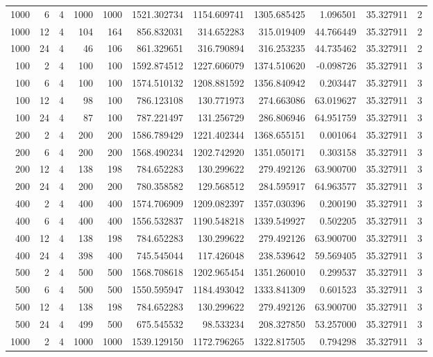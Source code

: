 \begin{table}
\begin{tabular}{rrrrrrrrrrr}
1000 & 6 & 4 & 1000 & 1000 & 1521.302734 & 1154.609741 & 1305.685425 & 1.096501 & 35.327911 & 2 \\
1000 & 12 & 4 & 104 & 164 & 856.832031 & 314.652283 & 315.019409 & 44.766449 & 35.327911 & 2 \\
1000 & 24 & 4 & 46 & 106 & 861.329651 & 316.790894 & 316.253235 & 44.735462 & 35.327911 & 2 \\
100 & 2 & 4 & 100 & 100 & 1592.874512 & 1227.606079 & 1374.510620 & -0.098726 & 35.327911 & 3 \\
100 & 6 & 4 & 100 & 100 & 1574.510132 & 1208.881592 & 1356.840942 & 0.203447 & 35.327911 & 3 \\
100 & 12 & 4 & 98 & 100 & 786.123108 & 130.771973 & 274.663086 & 63.019627 & 35.327911 & 3 \\
100 & 24 & 4 & 87 & 100 & 787.221497 & 131.256729 & 286.806946 & 64.951759 & 35.327911 & 3 \\
200 & 2 & 4 & 200 & 200 & 1586.789429 & 1221.402344 & 1368.655151 & 0.001064 & 35.327911 & 3 \\
200 & 6 & 4 & 200 & 200 & 1568.490234 & 1202.742920 & 1351.050171 & 0.303158 & 35.327911 & 3 \\
200 & 12 & 4 & 138 & 198 & 784.652283 & 130.299622 & 279.492126 & 63.900700 & 35.327911 & 3 \\
200 & 24 & 4 & 200 & 200 & 780.358582 & 129.568512 & 284.595917 & 64.963577 & 35.327911 & 3 \\
400 & 2 & 4 & 400 & 400 & 1574.706909 & 1209.082397 & 1357.030396 & 0.200190 & 35.327911 & 3 \\
400 & 6 & 4 & 400 & 400 & 1556.532837 & 1190.548218 & 1339.549927 & 0.502205 & 35.327911 & 3 \\
400 & 12 & 4 & 138 & 198 & 784.652283 & 130.299622 & 279.492126 & 63.900700 & 35.327911 & 3 \\
400 & 24 & 4 & 398 & 400 & 745.545044 & 117.426048 & 238.539642 & 59.569405 & 35.327911 & 3 \\
500 & 2 & 4 & 500 & 500 & 1568.708618 & 1202.965454 & 1351.260010 & 0.299537 & 35.327911 & 3 \\
500 & 6 & 4 & 500 & 500 & 1550.595947 & 1184.493042 & 1333.841309 & 0.601523 & 35.327911 & 3 \\
500 & 12 & 4 & 138 & 198 & 784.652283 & 130.299622 & 279.492126 & 63.900700 & 35.327911 & 3 \\
500 & 24 & 4 & 499 & 500 & 675.545532 & 98.533234 & 208.327850 & 53.257000 & 35.327911 & 3 \\
1000 & 2 & 4 & 1000 & 1000 & 1539.129150 & 1172.796265 & 1322.817505 & 0.794298 & 35.327911 & 3 \\

\end{tabular}
\end{table}
